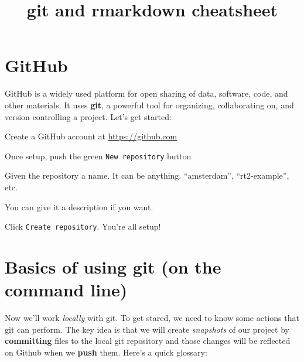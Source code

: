 \documentclass[12pt, a4paper]{article}
\title{git and rmarkdown cheatsheet}
\date{}
\begin{document}
\vspace{-6em}

\maketitle

\vspace{-5em}

\section{GitHub}

GitHub is a widely used platform for open sharing of data, software, code, and other materials. It uses \textbf{git}, a powerful tool for organizing, collaborating on, and version controlling a project. Let's get started:

\begin{enumerate*}
\item Create a GitHub account at \url{https://github.com}
\item Once setup, push the green \texttt{New repository} button
\item Given the repository a name. It can be anything. ``amsterdam'', ``rt2-example'', etc.
\item You can give it a description if you want.
\item Click \texttt{Create repository}. You're all setup!
\end{enumerate*}

\section{Basics of using git (on the command line)}

Now we'll work \textit{locally} with git. To get stared, we need to know some actions that git can perform. The key idea is that we will create \textit{snapshots} of our project by \textbf{committing} files to the local git repository and those changes will be reflected on Github when we \textbf{push} them. Here's a quick glossary:
\end{document}
